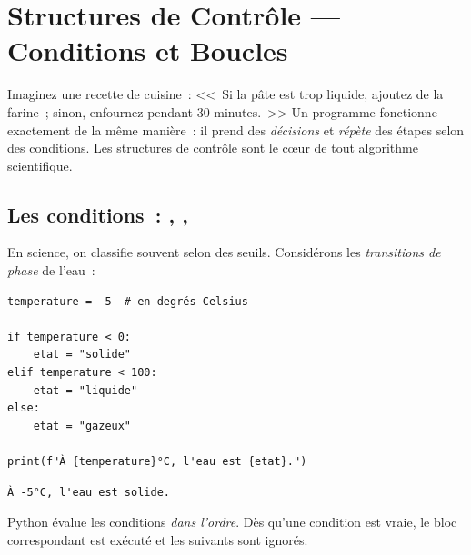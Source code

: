 \chapter{Structures de Contr\^ole --- Conditions et Boucles}
\label{ch:controle}

\begin{intuition}
Imaginez une recette de cuisine~: <<~Si la p\^ate est trop liquide, ajoutez de la farine~;
sinon, enfournez pendant 30 minutes.~>> Un programme fonctionne exactement de la m\^eme
mani\`ere~: il prend des \emph{d\'ecisions} et \emph{r\'ep\`ete} des \'etapes selon des conditions.
Les structures de contr\^ole sont le c\oe ur de tout algorithme scientifique.
\end{intuition}

\section{Les conditions~: , , }

En science, on classifie souvent selon des seuils. Consid\'erons les
\emph{transitions de phase} de l'eau~:

\begin{codeblock}[title=\textbf{Python}]
\begin{verbatim}
temperature = -5  # en degrés Celsius

if temperature < 0:
    etat = "solide"
elif temperature < 100:
    etat = "liquide"
else:
    etat = "gazeux"

print(f"À {temperature}°C, l'eau est {etat}.")
\end{verbatim}
\end{codeblock}

\begin{codeoutput}
\begin{verbatim}
À -5°C, l'eau est solide.
\end{verbatim}
\end{codeoutput}

\begin{remarque}
Python \'evalue les conditions \emph{dans l'ordre}. D\`es qu'une condition est vraie,
le bloc correspondant est ex\'ecut\'e et les suivants sont ignor\'es.
\end{remarque}

